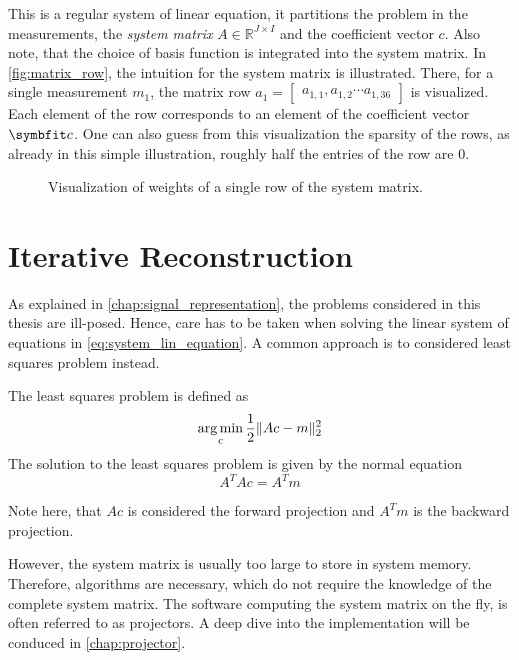 This is a regular system of linear equation, it partitions the problem in the measurements, the
\textit{system matrix} \(A \in \mathbb{R}^{J \times I}\) and the coefficient vector \(c\). Also
note, that the choice of basis function is integrated into the system matrix. In
\autoref{fig:matrix_row}, the intuition for the system matrix is illustrated. There, for a single
measurement \(m_1\), the matrix row \(a_{1} = \begin{bmatrix}a_{1, 1}, a_{1, 2} \cdots
	a_{1,36}\end{bmatrix}\) is visualized. Each element of the row corresponds to an element of the
coefficient vector \(\mvec{c}\). One can also guess from this visualization the sparsity of the
rows, as already in this simple illustration, roughly half the entries of the row are \(0\).

\begin{figure}
	\centering
	
	\caption{Visualization of weights of a single row of the system matrix. }\label{fig:matrix_row}
\end{figure}

\section{Iterative Reconstruction}\label{sec:iterative_reconstruction}

As explained in \autoref{chap:signal_representation}, the problems considered in this thesis are
ill-posed. Hence, care has to be taken when solving the linear system of equations in
\autoref{eq:system_lin_equation}. A common approach is to considered least squares problem instead.

\begin{definition}\label{def:least_squares_problem}
	The least squares problem is defined as
	\[ \operatorname*{arg\,min}_c \frac{1}{2} \lVert Ac - m\rVert^2_2 \]
	The solution to the least squares problem is given by the normal equation
	\[ A^T A c = A^T m \]
\end{definition}

Note here, that \(Ac\) is considered the forward projection and \(A^T m\) is the backward
projection.

However, the system matrix is usually too large to store in system memory. Therefore, algorithms are
necessary, which do not require the knowledge of the complete system matrix. The software computing
the system matrix on the fly, is often referred to as projectors. A deep dive into the
implementation will be conduced in \autoref{chap:projector}.

